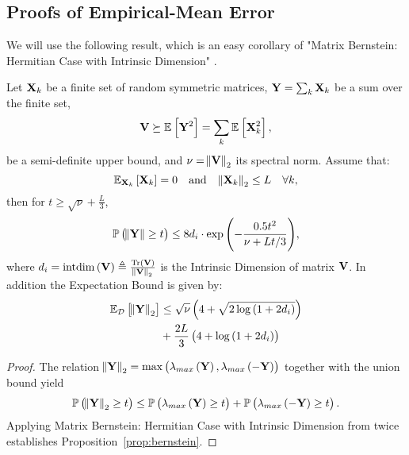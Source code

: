 \subsection{Proofs of 
Empirical-Mean Error}\label{apx:proof_sample_error}
{We will use the following result, which is an easy corollary of} "Matrix Bernstein: Hermitian Case with Intrinsic Dimension" \cite[Chapter 7]{tropp2015introduction}.
\begin{prop}
    \label{prop:bernstein}
    Let $\mathbf{X}_k$ be a finite set of random symmetric matrices, $\mathbf{Y}=\sum_{k}\mathbf{X}_k$ be a sum over the finite set,  $$\mathbf{V}\succeq \mathbb{E}_{}\left[\mathbf{Y}^2\right]=\sum_k\mathbb{E}_{}\left[\mathbf{X}_k^2\right],$$ 
    be a semi-definite upper bound, and $\nu=\norm{\mathbf{V}}_2$ its {spectral} norm.     Assume that:
    $$\mathbb{E}_{\mathbf{X}_k}\left[\mathbf{X}_k\right]=0\quad\mathrm{and} \quad \norm{\mathbf{X}_k}_2\leq L \quad\forall k,$$
     then for $t\geq \sqrt{\nu}+\frac{L}{3}$,
   \begin{equation}\label{eq:lemma_bernstein_prob}
        \mathbb{P}\left(\norm{\mathbf{Y}}\geq t\right)\leq 8 d_i
        \cdot\exp{\left(-\frac{0.5t^2}{\nu+Lt/3}\right)},
    \end{equation}
    where $d_i=\mathrm{intdim}\left(\mathbf{V}\right)\triangleq\frac{\mathrm{Tr}\left(\mathbf{V}\right)}{\norm{\mathbf{V}}_2}$ is the Intrinsic Dimension of matrix $\mathbf{V}$. In addition the Expectation Bound is given by:
    \begin{align}\label{eq:lemma_bound_expection}
        \mathbb{E}_{\mathcal{D}}\left[\norm{\mathbf{Y}}_2\right]&\leq \sqrt{\nu}\left(4+\sqrt{2\log\left(1+2d_i\right)}\right) \nonumber\\ 
        &+\frac{2L}{3}\left(4+\log\left(
        1+2d_i\right)\right)
    \end{align}
    
\end{prop}
\begin{proof}
    {The relation} 
    $\norm{\mathbf{Y}}_2=\max\left(\lambda_{max}\left(\mathbf{Y}\right),\lambda_{max}\left(-\mathbf{Y}\right)\right)$ %
    together with the union bound {yield}
    \begin{align*}
        \mathbb{P}\left(\norm{\mathbf{Y}}_2\geq t\right)\leq\mathbb{P}\left(\lambda_{max}\left(\mathbf{Y}\right)\geq t\right)+\mathbb{P}\left(\lambda_{max}\left(-\mathbf{Y}\right)\geq t\right).
    \end{align*}
    {Applying} Matrix Bernstein: Hermitian Case with Intrinsic Dimension from \cite[Chapter 7]{tropp2015introduction} twice {establishes}  Proposition~\ref{prop:bernstein}. 
\end{proof}
